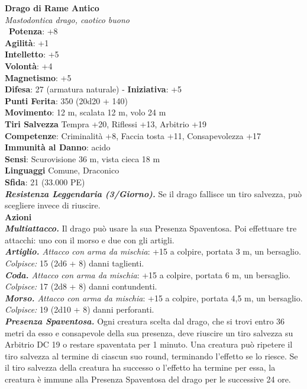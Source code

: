 \begin{multicols}{2}
\medskip\textbf{Drago di Rame Antico}\\
\emph{Mastodontica drago, caotico buono}\\\
\textbf{Potenza}: +8\\
\textbf{Agilità}: +1\\
\textbf{Intelletto}: +5\\
\textbf{Volontà}: +4\\
\textbf{Magnetismo}: +5\\
\textbf{Difesa}: 27 (armatura naturale) - \textbf{Iniziativa}: +5\\
\textbf{Punti Ferita}: 350 (20d20 + 140)\\
\textbf{Movimento}: 12 m, scalata 12 m, volo 24 m\\
\textbf{Tiri Salvezza} Tempra +20, Riflessi +13, Arbitrio +19\\
\textbf{Competenze}: Criminalità +8, Faccia tosta +11, Consapevolezza +17\\
\textbf{Immunità al Danno}: acido\\
\textbf{Sensi}: Scurovisione 36 m, vista cieca 18 m\\
\textbf{Linguaggi} Comune, Draconico\\
\textbf{Sfida}: 21 (33.000 PE)\smallskip\\
\emph{\textbf{Resistenza Leggendaria (3/Giorno).}} Se il drago fallisce un tiro salvezza, può scegliere invece di riuscire.\\
\smallskip\textbf{Azioni}\\
\emph{\textbf{Multiattacco.}} Il drago può usare la sua Presenza Spaventosa. Poi effettuare tre attacchi: uno con il morso e due con gli artigli.\\
\emph{\textbf{Artiglio.} Attacco con arma da mischia}: +15 a colpire, portata 3 m, un bersaglio.\\
\emph{Colpisce:} 15 (2d6 + 8) danni taglienti.\\
\emph{\textbf{Coda.} Attacco con arma da mischia}: +15 a colpire, portata 6 m, un bersaglio.\\
\emph{Colpisce:} 17 (2d8 + 8) danni contundenti.\\
\emph{\textbf{Morso.} Attacco con arma da mischia}: +15 a colpire, portata 4,5 m, un bersaglio.\\
\emph{Colpisce:} 19 (2d10 + 8) danni perforanti.\\
\emph{\textbf{Presenza Spaventosa.}} Ogni creatura scelta dal drago, che si trovi entro 36 metri da esso e consapevole della sua presenza, deve riuscire un tiro salvezza su Arbitrio DC 19 o restare spaventata per 1 minuto. Una creatura può ripetere il tiro salvezza al termine di ciascun suo round, terminando l'effetto se lo riesce. Se il tiro salvezza della creatura ha successo o l'effetto ha termine per essa, la creatura è immune alla Presenza Spaventosa del drago per le successive 24 ore.\\

\end{multicols}
